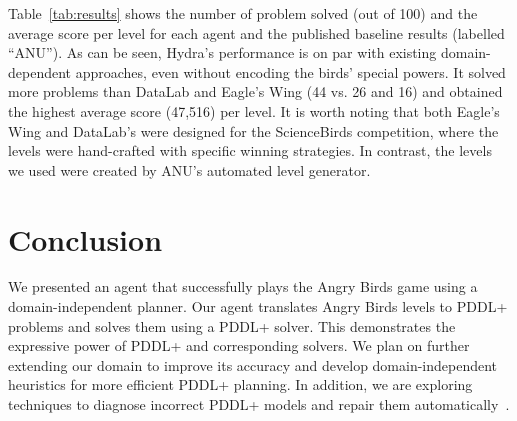 \documentclass[letterpaper]{article}
\begin{document}
Table~\ref{tab:results} shows the number of problem solved (out of 100) and the average score per level for each agent and the published baseline results (labelled ``ANU'').
As can be seen, Hydra's performance is on par with existing domain-dependent approaches, even without encoding the birds' special powers. It solved more problems than DataLab and Eagle's Wing (44 vs. 26 and 16) and obtained the highest average score (47,516) per level.
It is worth noting that both Eagle's Wing and DataLab's were designed for the ScienceBirds competition, where the levels were hand-crafted with specific winning strategies. In contrast, the levels we used were created by ANU's automated level generator.

















\vspace{-0.90mm}
\vspace{-1.64mm}
\section{Conclusion}




We presented an agent that successfully plays the Angry Birds game  using a domain-independent planner.
Our agent translates Angry Birds levels to PDDL+ problems and solves them using a PDDL+ solver.
This demonstrates the expressive power of PDDL+ and corresponding solvers.
We plan on further extending our domain to improve its accuracy and develop domain-independent heuristics for more efficient PDDL+ planning.
In addition, we are exploring techniques to diagnose incorrect PDDL+ models and repair them automatically~\cite{klenk2020model}.
\end{document}
